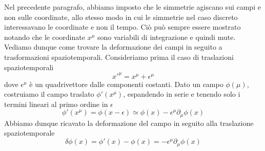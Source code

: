     Nel precedente paragrafo, abbiamo imposto che le simmetrie agiscano sui campi e non sulle coordinate, allo stesso modo in cui le simmetrie nel caso discreto interessavano le coordinate e non il tempo. Ciò può sempre essere mostrato notando che le coordinate $x^\mu$ sono variabili di integrazione e quindi mute. Vediamo dunque come trovare la deformazione dei campi in seguito a trasformazioni spaziotemporali. Consideriamo prima il caso di traslazioni spaziotemporali
    \begin{equation*}
        x'^\mu = x^\mu + \epsilon^\mu
    \end{equation*} 
        dove $\epsilon^\mu$ è un quadrivettore dalle componenti costanti. Dato un campo $\phi(\mu)$, costruiamo il campo traslato $\phi'(x^\mu)$, espandendo in serie e tenendo solo i termini lineari al primo ordine in $\epsilon$
    \begin{equation*}
        \phi'(x^\mu) = \phi(x - \epsilon) \simeq \phi(x) - \epsilon^\mu \partial_\mu \phi(x)
    \end{equation*}
        Abbiamo dunque ricavato la deformazione del campo in seguito alla traslazione spaziotemporale 
    \begin{equation*}
        \delta \phi(x) = \phi'(x) - \phi(x) = -\epsilon^\mu \partial_\mu \phi (x)
    \end{equation*}

